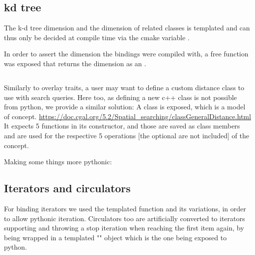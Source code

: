 
\subsection{kd tree}
\label{sec:code:kdtree}
The k-d tree dimension and the dimension of related classes is
templated and can thus only be decided at compile time via the cmake
variable .

In order to assert the dimension the bindings were compiled with, a
free function  was
exposed that returns the dimension as an .

\subsection{}
\label{sec:code:distance}
Similarly to overlay traits, a user may want to define a custom
distance class to use with search queries. Here too, as defining a new
c++ class is not possible from python, we provide a similar solution:
A  class is exposed, which is a model of
 concept.
\url{https://doc.cgal.org/5.2/Spatial_searching/classGeneralDistance.html}
It expects 5 functions in its constructor, and those are saved as
class members and are used for the respective 5 operations [the
optional are not included] of the concept.

Making some things more pythonic:

\subsection{Iterators and circulators}
\label{sec:code:iters}
For binding iterators we used the 
templated function and its variations, in order to allow pythonic
iteration. Circulators too are artificially converted to iterators
supporting  and throwing a stop iteration when
reaching the first item again, by being wrapped in a templated
"" object which is the one being
exposed to python.

